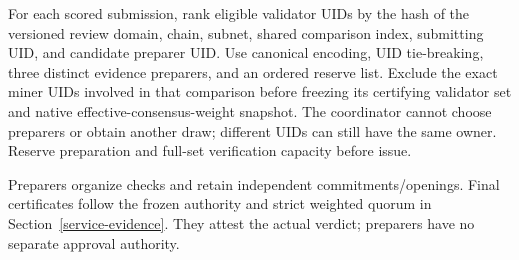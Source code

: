 For each scored submission, rank eligible validator UIDs by the hash of
the versioned review domain, chain, subnet, shared comparison index,
submitting UID, and candidate preparer UID. Use canonical encoding, UID tie-breaking,
three distinct evidence preparers, and an ordered reserve list. Exclude
the exact miner UIDs involved in that comparison before freezing its
certifying validator set and native effective-consensus-weight snapshot.
The coordinator cannot choose preparers or obtain another draw; different
UIDs can still have the same owner. Reserve preparation and full-set
verification capacity before issue.

Preparers organize checks and retain independent commitments/openings.
Final certificates follow the frozen authority and strict weighted
quorum in Section~\ref{service-evidence}. They attest the actual verdict;
preparers have no separate approval authority.

